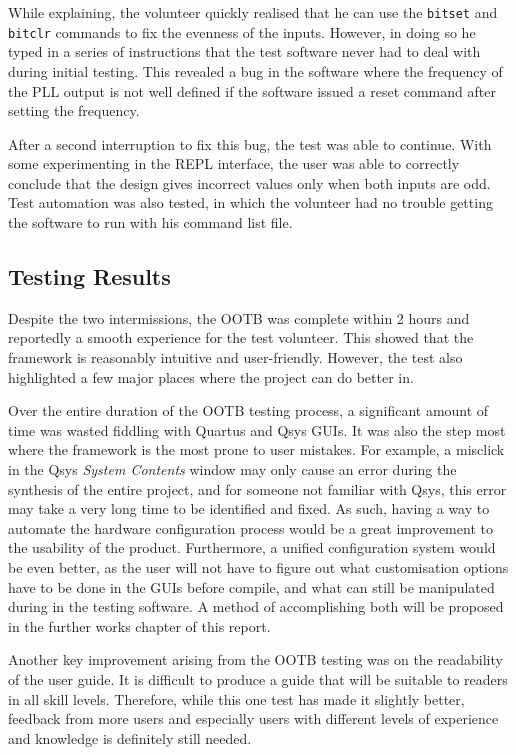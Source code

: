While explaining, the volunteer quickly realised that he can use the \texttt{bitset} and \texttt{bitclr} commands to fix the evenness of the inputs.
However, in doing so he typed in a series of instructions that the test software never had to deal with during initial testing.
This revealed a bug in the software where the frequency of the PLL output is not well defined if the software issued a reset command after setting the frequency.

After a second interruption to fix this bug, the test was able to continue.
With some experimenting in the REPL interface, the user was able to correctly conclude that the design gives incorrect values only when both inputs are odd.
Test automation was also tested, in which the volunteer had no trouble getting the software to run with his command list file.

\subsection{Testing Results}
Despite the two intermissions, the OOTB was complete within 2 hours and reportedly a smooth experience for the test volunteer.
This showed that the framework is reasonably intuitive and user-friendly.
However, the test also highlighted a few major places where the project can do better in.

Over the entire duration of the OOTB testing process, a significant amount of time was wasted fiddling with Quartus and Qsys GUIs.
It was also the step most where the framework is the most prone to user mistakes.
For example, a misclick in the Qsys \textit{System Contents} window may only cause an error during the synthesis of the entire project, and for someone not familiar with Qsys, this error may take a very long time to be identified and fixed.
As such, having a way to automate the hardware configuration process would be a great improvement to the usability of the product.
Furthermore, a unified configuration system would be even better, as the user will not have to figure out what customisation options have to be done in the GUIs before compile, and what can still be manipulated during in the testing software.
A method of accomplishing both will be proposed in the further works chapter of this report.

Another key improvement arising from the OOTB testing was on the readability of the user guide.
It is difficult to produce a guide that will be suitable to readers in all skill levels.
Therefore, while this one test has made it slightly better, feedback from more users and especially users with different levels of experience and knowledge is definitely still needed.
